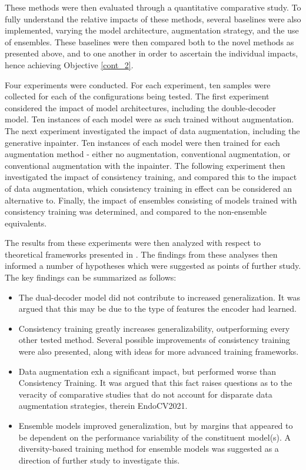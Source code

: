     These methods were then evaluated through a quantitative comparative study. To fully understand the relative impacts of these methods, several baselines were also implemented, varying the model architecture, augmentation strategy, and the use of ensembles. These baselines were then compared both to the novel methods as presented above, and to one another in order to ascertain the individual impacts, hence achieving Objective \ref{cont_2}.
    
    Four experiments were conducted. For each experiment, ten samples were collected for each of the configurations being tested. The first experiment considered the impact of model architectures, including the double-decoder model. Ten instances of each model were as such trained without augmentation. The next experiment investigated the impact of data augmentation, including the generative inpainter. Ten instances of each model were then trained for each augmentation method - either no augmentation, conventional augmentation, or conventional augmentation with the inpainter. The following experiment then investigated the impact of consistency training, and compared this to the impact of data augmentation, which consistency training in effect can be considered an alternative to. Finally, the impact of ensembles consisting of models trained with consistency training was determined, and compared to the non-ensemble equivalents. 
    
    The results from these experiments were then analyzed with respect to theoretical frameworks presented in . The findings from these analyses then informed a number of hypotheses which were suggested as points of further study. The key findings can be summarized as follows:
    \begin{itemize}
        \item The dual-decoder model did not contribute to increased generalization. It was argued that this may be due to the type of features the encoder had learned.
    
        \item Consistency training greatly increases generalizability, outperforming every other tested method. Several possible improvements of consistency training were also presented, along with ideas for more advanced training frameworks.
        
        \item Data augmentation exh a significant impact, but performed worse than Consistency Training. It was argued that this fact raises questions as to the veracity of comparative studies that do not account for disparate data augmentation strategies, therein EndoCV2021.
    
        \item Ensemble models improved generalization, but by margins that appeared to be dependent on the performance variability of the constituent model(s). A diversity-based training method for ensemble models was suggested as a direction of further study to investigate this.
    \end{itemize}


